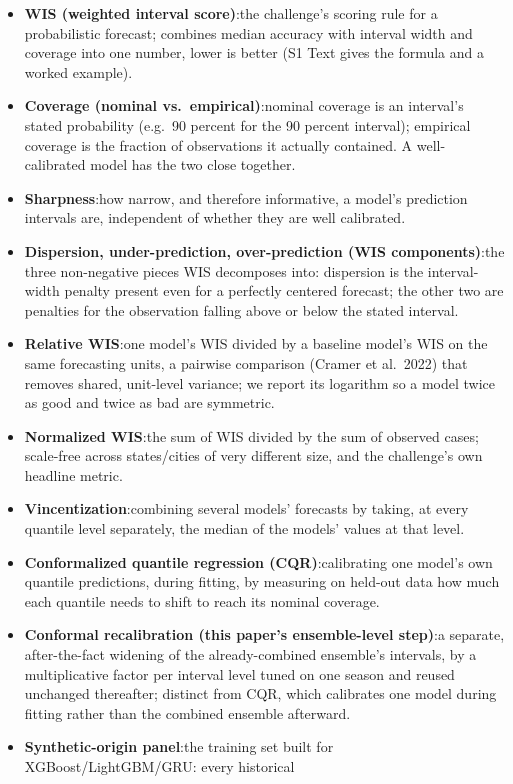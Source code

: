 \documentclass[11pt]{article}
\begin{document}
\begin{itemize}
\item \textbf{WIS (weighted interval score)}:the challenge's scoring rule for a probabilistic
forecast; combines median accuracy with interval width and coverage into one number, lower is
better (S1 Text gives the formula and a worked example).
\item \textbf{Coverage (nominal vs.\ empirical)}:nominal coverage is an interval's stated
probability (e.g.\ 90 percent for the 90 percent interval); empirical coverage is the fraction of
observations it actually contained. A well-calibrated model has the two close together.
\item \textbf{Sharpness}:how narrow, and therefore informative, a model's prediction intervals
are, independent of whether they are well calibrated.
\item \textbf{Dispersion, under-prediction, over-prediction (WIS components)}:the three
non-negative pieces WIS decomposes into: dispersion is the interval-width penalty present even for
a perfectly centered forecast; the other two are penalties for the observation falling above or
below the stated interval.
\item \textbf{Relative WIS}:one model's WIS divided by a baseline model's WIS on the same
forecasting units, a pairwise comparison (Cramer et al.\ 2022) that removes shared, unit-level
variance; we report its logarithm so a model twice as good and twice as bad are symmetric.
\item \textbf{Normalized WIS}:the sum of WIS divided by the sum of observed cases; scale-free
across states/cities of very different size, and the challenge's own headline metric.
\item \textbf{Vincentization}:combining several models' forecasts by taking, at every quantile
level separately, the median of the models' values at that level.
\item \textbf{Conformalized quantile regression (CQR)}:calibrating one model's own quantile
predictions, during fitting, by measuring on held-out data how much each quantile needs to shift to
reach its nominal coverage.
\item \textbf{Conformal recalibration (this paper's ensemble-level step)}:a separate,
after-the-fact widening of the already-combined ensemble's intervals, by a multiplicative factor per
interval level tuned on one season and reused unchanged thereafter; distinct from CQR, which
calibrates one model during fitting rather than the combined ensemble afterward.
\item \textbf{Synthetic-origin panel}:the training set built for XGBoost/LightGBM/GRU: every historical

\end{itemize}
\end{document}
